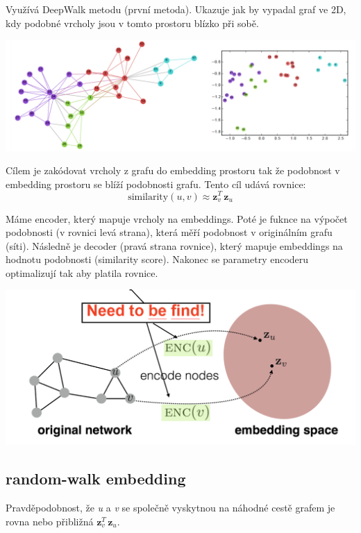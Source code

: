 Využívá DeepWalk metodu (první metoda). 
Ukazuje jak by vypadal graf ve 2D, kdy podobné vrcholy jsou v tomto prostoru blízko při sobě.

\begin{center}
	\includegraphics[width=\textwidth]{images/deepwalkGraph.png}
\end{center}

Cílem je zakódovat vrcholy z grafu do embedding prostoru tak že podobnost v embedding prostoru se blíží podobnosti grafu.
Tento cíl udává rovnice:
\[\text{similarity}(u,v)\approx \mathbf{z}_{v}^{T}\,\mathbf{z}_{u}\]

Máme encoder, který mapuje vrcholy na embeddings. 
Poté je fuknce na výpočet podobnosti (v rovnici levá strana), která měří podobnost v originálním grafu (síti). 
Následně je decoder (pravá strana rovnice), který mapuje embeddings na hodnotu podobnosti (similarity score). 
Nakonec se parametry encoderu optimalizují tak aby platila rovnice. 

\begin{center}
	\includegraphics[width=\textwidth]{images/similarity.png}
\end{center}

\subsection{random-walk embedding}

Pravděpodobnost, že \textit{u} a \textit{v} se společně vyskytnou na náhodné cestě grafem je rovna nebo přibližná $\mathbf{z}_{v}^{T}\,\mathbf{z}_{u}$.

